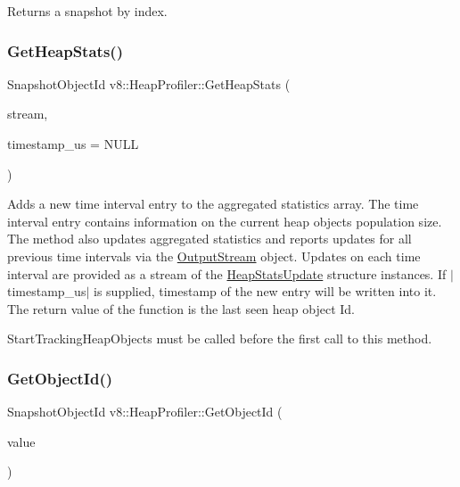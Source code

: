 Returns a snapshot by index. \mbox{\label{classv8_1_1HeapProfiler_a756d71126e0effc7543fb33e856dd738}} 
\subsubsection{\texorpdfstring{Get\+Heap\+Stats()}{GetHeapStats()}}
{\footnotesize\ttfamily Snapshot\+Object\+Id v8\+::\+Heap\+Profiler\+::\+Get\+Heap\+Stats (\begin{DoxyParamCaption}\item[{\mbox{\hyperlink{classv8_1_1OutputStream}{Output\+Stream}} $\ast$}]{stream,  }\item[{int64\+\_\+t $\ast$}]{timestamp\+\_\+us = {\ttfamily NULL} }\end{DoxyParamCaption})}

Adds a new time interval entry to the aggregated statistics array. The time interval entry contains information on the current heap objects population size. The method also updates aggregated statistics and reports updates for all previous time intervals via the \mbox{\hyperlink{classv8_1_1OutputStream}{Output\+Stream}} object. Updates on each time interval are provided as a stream of the \mbox{\hyperlink{structv8_1_1HeapStatsUpdate}{Heap\+Stats\+Update}} structure instances. If $\vert$timestamp\+\_\+us$\vert$ is supplied, timestamp of the new entry will be written into it. The return value of the function is the last seen heap object Id.

Start\+Tracking\+Heap\+Objects must be called before the first call to this method. \mbox{\label{classv8_1_1HeapProfiler_ab926a1f1ed95b731d4ef3133e67eef19}} 
\subsubsection{\texorpdfstring{Get\+Object\+Id()}{GetObjectId()}}
{\footnotesize\ttfamily Snapshot\+Object\+Id v8\+::\+Heap\+Profiler\+::\+Get\+Object\+Id (\begin{DoxyParamCaption}\item[{\mbox{\hyperlink{classv8_1_1Local}{Local}}$<$ \mbox{\hyperlink{classv8_1_1Value}{Value}} $>$}]{value }\end{DoxyParamCaption})}

